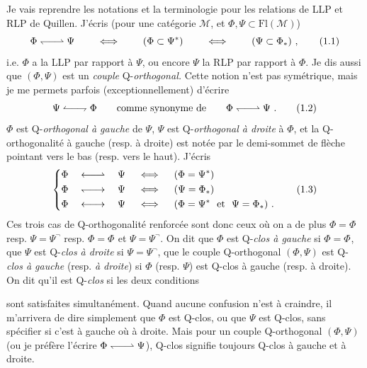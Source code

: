 \documentclass[11pt]{article}
\newcommand{\msp}[1]{\marginpar{\footnotesize [#1]}}
\newcommand{\Qo}{\mathrel{\leftharpoondown\joinrel\relbar\joinrel\rightharpoonup}}   %
\newcommand{\Qorev}{\mathrel{\leftharpoonup\joinrel\relbar\joinrel\rightharpoondown}} %
\newcommand{\Qog}{\mathrel{\leftarrow\joinrel\relbar\joinrel\rightharpoonup}}         %
\newcommand{\Qod}{\mathrel{\leftharpoondown\joinrel\relbar\joinrel\rightarrow}}       %
\newcommand{\Qogd}{\mathrel{\leftarrow\joinrel\relbar\joinrel\rightarrow}}            %
\newcommand{\tld}{\tilde{}}   %
\newcommand{\rcl}{\neg}       %
\begin{document}
Je vais reprendre les notations et la terminologie pour les relations de LLP et RLP de Quillen. J'écris (pour une catégorie $\mathcal{M}$, et $\Phi, \Psi \subset \mathrm{Fl}(\mathcal{M})$)
\[
\Phi \Qo \Psi \qquad \iff \qquad (\Phi \subset \Psi^{*}) \qquad \iff \qquad (\Psi \subset \Phi_{*})\ ,
\tag*{(1.1)}
\]
i.e. $\Phi$ a la LLP par rapport à $\Psi$, ou encore $\Psi$ la RLP par rapport à $\Phi$. Je dis aussi que $(\Phi, \Psi)$ est un \textit{couple} Q-\textit{orthogonal.} Cette notion n'est pas symétrique, mais je me permets parfois (exceptionnellement) d'écrire
\[
\Psi \Qorev \Phi \qquad \text{comme synonyme de} \qquad \Phi \Qo \Psi\ .
\tag*{(1.2)}
\]
$\Phi$ est Q-\textit{orthogonal à gauche} de $\Psi$, $\Psi$ est Q-\textit{orthogonal à droite} à $\Phi$, et la Q-orthogonalité à gauche (resp. à droite) est notée par le demi-sommet de flèche pointant vers le bas (resp. vers le haut). J'écris
\[
\left\{
\begin{aligned}
&\Phi \quad \Qog \quad \Psi \quad \iff \quad (\Phi = \Psi^{*})\\
&\Phi \quad \Qod \quad \Psi \quad \iff \quad (\Psi = \Phi_{*})\\
&\Phi \quad \Qogd \quad \Psi \quad \iff \quad (\Phi = \Psi^{*} \ \text{ et } \ \Psi = \Phi_{*})\ .
\end{aligned}
\right.
\tag*{(1.3)}
\]
Ces trois cas de Q-orthogonalité renforcée sont donc ceux où on a de plus $\Phi = \Phi^{\tld}$
resp. $\Psi = \Psi^{\rcl}$ resp. $\Phi = \Phi^{\tld}$ et $\Psi = \Psi^{\rcl}$. On dit que $\Phi$ est Q-\textit{clos à gauche} si $\Phi = \Phi^{\tld}$, que %
$\Psi$ est Q-\textit{clos à droite} si $\Psi = \Psi^{\rcl}$, que le couple Q-orthogonal $(\Phi, \Psi)$ est Q-\textit{clos à gauche} (resp. \textit{à droite}) si $\Phi$ (resp. $\Psi$) est Q-clos à gauche (resp. à droite). On dit qu'il est Q-\textit{clos} si les deux conditions %

\msp{page 2}

sont satisfaites simultanément. Quand aucune confusion n'est à craindre, il m'arrivera de dire simplement que $\Phi$ est Q-clos, ou que $\Psi$ est Q-clos, sans spécifier si c'est à gauche où %
à droite. Mais pour un couple Q-orthogonal $(\Phi, \Psi)$ (ou je préfère l'écrire $\Phi \Qo \Psi$), Q-clos %
signifie toujours Q-clos à gauche et à droite.
\end{document}
